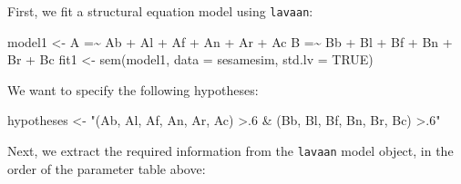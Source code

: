 \documentclass[
]{book}
\newenvironment{Shaded}{\begin{snugshade}}{\end{snugshade}}
\newcommand{\AttributeTok}[1]{\textcolor[rgb]{0.77,0.63,0.00}{#1}}
\newcommand{\ConstantTok}[1]{\textcolor[rgb]{0.00,0.00,0.00}{#1}}
\newcommand{\FunctionTok}[1]{\textcolor[rgb]{0.00,0.00,0.00}{#1}}
\newcommand{\NormalTok}[1]{#1}
\newcommand{\OtherTok}[1]{\textcolor[rgb]{0.56,0.35,0.01}{#1}}
\newcommand{\StringTok}[1]{\textcolor[rgb]{0.31,0.60,0.02}{#1}}
\begin{document}
First, we fit a structural equation model using \texttt{lavaan}:

\begin{Shaded}
\begin{Highlighting}[]
\NormalTok{model1 }\OtherTok{\textless{}{-}} \StringTok{\textquotesingle{}A =\textasciitilde{} Ab + Al + Af + An + Ar + Ac }
\StringTok{           B =\textasciitilde{} Bb + Bl + Bf + Bn + Br + Bc\textquotesingle{}}
\NormalTok{fit1 }\OtherTok{\textless{}{-}} \FunctionTok{sem}\NormalTok{(model1, }\AttributeTok{data =}\NormalTok{ sesamesim, }\AttributeTok{std.lv =} \ConstantTok{TRUE}\NormalTok{)}
\end{Highlighting}
\end{Shaded}

We want to specify the following hypotheses:

\begin{Shaded}
\begin{Highlighting}[]
\NormalTok{hypotheses }\OtherTok{\textless{}{-}} \StringTok{"(Ab, Al, Af, An, Ar, Ac) \textgreater{}.6 \&}
\StringTok{               (Bb, Bl, Bf, Bn, Br, Bc) \textgreater{}.6"}
\end{Highlighting}
\end{Shaded}

Next, we extract the required information from the \texttt{lavaan} model object, in the order of the parameter table above:
\end{document}
